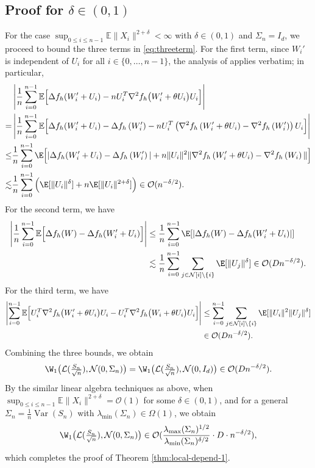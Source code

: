 \documentclass[mnsc,nonblindrev]{informs3}
\begin{document}
\subsection{Proof for $\delta \in (0,1)$}\label{sec:proof-local-depend-1-other}
For the case $\sup_{0\le i\le n-1}\mathbb{E}\|X_i\|^{2+\delta}<\infty$ with $\delta\in(0,1)$ and $\Sigma_n=I_d$, we proceed to bound the three terms in \eqref{eq:threeterm}.
 For the first term, since $W_i'$ is independent of $U_i$ for all $i\in\{0,\ldots,n-1\}$, the analysis of \cite{gallouet2018regularity} applies verbatim; in particular,
 \begin{align*}
 &\left|\frac{1}{n} \sum_{i=0}^{n-1} \mathbb{E}\Big[\Delta f_h(W_i'+U_i)-nU_i^T \nabla^2 f_h\big(W_i'+\theta U_i\big) U_i\Big]\right|\\
=&\left|\frac{1}{n} \sum_{i=0}^{n-1} \mathbb{E}\Big[\Delta f_h(W_i'+U_i)-\Delta f_h\left(W_i'\right)-nU_i^T\left(\nabla^2 f_h\left(W_i'+\theta U_i\right)-\nabla^2 f_h\left(W_i'\right)\right) U_i\Big]\right|\\
\leq & \frac{1}{n} \sum_{i=0}^{n-1}\E\Big[|\Delta f_h(W_i'+U_i)-\Delta f_h\left(W_i'\right)| + n\|U_i\|^2\|\nabla^2 f_h\left(W_i'+\theta U_i\right)-\nabla^2 f_h\left(W_i\right)\|\Big] \\
\lesssim & \frac{1}{n} \sum_{i=0}^{n-1} \Big(\E[\|U_i\|^\delta] + n\E[\|U_i\|^{2+\delta}]\Big) \in \mathcal O(n^{-\delta/2}).
 \end{align*}
 For the second term, we have
 \begin{align*}
   \left|\frac{1}{n} \sum_{i=0}^{n-1}\mathbb{E}\Big[\Delta f_h(W)-\Delta f_h(W_i'+U_i)\Big]\right| &\leq \frac{1}{n} \sum_{i=0}^{n-1}\E[|\Delta f_h(W)-\Delta f_h(W_i'+U_i)|] \\
   &\lesssim \frac{1}{n} \sum_{i=0}^{n-1} \sum_{j \in \mathcal N[i] \setminus \{i\}}\E[\|U_j\|^\delta] \in \mathcal O( Dn^{-\delta/2}).
 \end{align*}
 For the third term, we have
 \begin{align*}
   \left|\sum_{i=0}^{n-1}\mathbb{E}\Big[U_i^T \nabla^2 f_h\big(W_i'+\theta U_i\big) U_i-U_i^T \nabla^2 f_h\big(W_i+\theta U_i\big) U_i\Big]\right| &\leq \sum_{i=0}^{n-1} \sum_{j \in \mathcal N[i] \setminus \{i\} }\E[\|U_i\|^2\|U_j\|^\delta] \\
   & \in \mathcal O( Dn^{-\delta/2}).
 \end{align*}
Combining the three bounds, we obtain
 \[
\W_1\big(\mathcal{L}(\tfrac{S_n}{\sqrt{n}}),\mathcal{N}(0,\Sigma_n)\big)=\W_1\big(\mathcal{L}(\tfrac{S_n}{\sqrt{n}}),\mathcal{N}(0,I_d)\big)
\in \mathcal{O} (Dn^{-\delta/2}).
\]
By the similar linear algebra techniques as above, when $\sup_{0\le i\le n-1}\mathbb{E}\|X_i\|^{2+\delta}=\mathcal{O}(1)$ for some $\delta\in(0,1)$, and for a general
$\Sigma_n=\tfrac{1}{n}\operatorname{Var}(S_n)$ with $\lambda_{\min}(\Sigma_n)\in\Omega(1)$, we obtain
 \[
\W_1\big(\mathcal{L}(\tfrac{S_n}{\sqrt{n}}),\mathcal{N}(0,\Sigma_n)\big) \in \mathcal{O} (\frac{\lambda_{\max}(\Sigma_n)^{1/2}}{\lambda_{\min}(\Sigma_n)^{ \delta/2}}\cdot D\cdot n^{-\delta/2}),
\]
which completes the proof of Theorem \ref{thm:local-depend-1}.
\end{document}
